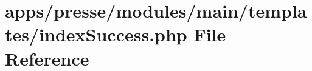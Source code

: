 \hypertarget{presse_2modules_2main_2templates_2index_success_8php}{\section{apps/presse/modules/main/templates/index\-Success.php File Reference}
\label{presse_2modules_2main_2templates_2index_success_8php}
}

